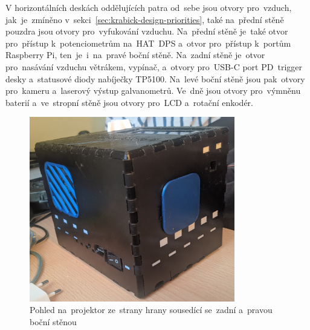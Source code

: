 V horizontálních deskách oddělujících patra od~sebe jsou otvory pro~vzduch, jak~je~zmíněno v~sekci~\ref{sec:krabick-design-priorities}, také na~přední stěně pouzdra jsou otvory pro~vyfukování vzduchu. Na~přední stěně je~také otvor pro~přístup k~potenciometrům na~HAT~DPS a~otvor pro~přístup k~portům Raspberry Pi, ten~je~i~na~pravé boční stěně.
Na~zadní stěně je~otvor pro~nasávání vzduchu větrákem, vypínač, a~otvory pro~USB-C port PD~trigger desky a~statusové diody nabíječky TP5100. Na~levé boční stěně jsou pak~otvory pro~kameru a~laserový výstup galvanometrů. Ve~dně jsou otvory pro~výmněnu baterií a~ve~stropní stěně jsou otvory pro~LCD a~rotační enkodér.

\begin{figure}[htb]
  \centering
  \includegraphics[width=0.8\textwidth]{img/hw_sides_backleft.jpg}
  \caption{\label{fig:hw_sides_backleft.jpg} Pohled na~projektor ze~strany hrany sousedící se~zadní a~pravou boční stěnou}
\end{figure}


